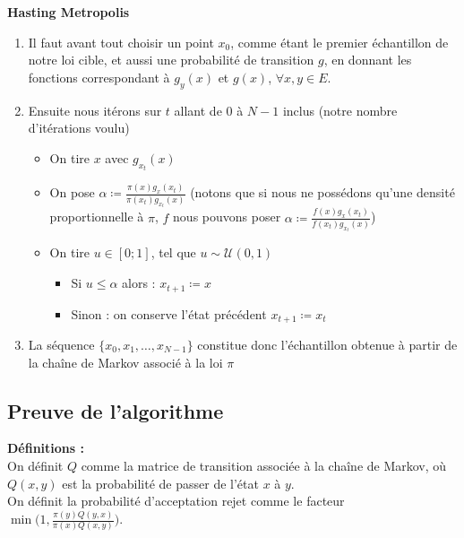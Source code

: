\documentclass{article}
\begin{document}
{\bf Hasting Metropolis} \begin{enumerate}
    \item Il faut avant tout choisir un point $x_0$, comme étant le premier échantillon de notre loi cible, et aussi une probabilité de transition $g$, en donnant les fonctions correspondant à $g_y(x)$ et $g(x)$, $\forall x,y \in E$.
    \item Ensuite nous itérons sur $t$ allant de 0 à $N-1$ inclus (notre nombre d'itérations voulu)
    \begin{itemize}
        \item On tire $x$ avec $g_{x_t}(x)$  
        \item On pose $\alpha \coloneqq \frac{ \pi(x) g_x(x_t)}{\pi(x_t) g_{x_t}(x)}$ (notons que si nous ne possédons qu'une densité proportionnelle à $\pi$, $f$ nous pouvons poser $\alpha \coloneqq \frac{ f(x) g_x(x_t)}{f(x_t) g_{x_t}(x)}$)  
        \item On tire $u \in [0;1]$, tel que $u  \sim \mathcal{U}(0,1)$ 
        \begin{itemize}
            \item Si $u \leqslant \alpha$ alors : $x_{t+1} \coloneqq x$  
            \item Sinon : on conserve l'état précédent $x_{t+1} \coloneqq x_t$  
        \end{itemize}
    \end{itemize}
    \item La séquence $\{x_0,x_1, \ldots ,x_{N-1}\}$ constitue donc l'échantillon obtenue à partir de la chaîne de Markov associé à la loi $\pi$
\end{enumerate}

\subsection{Preuve de l'algorithme}


\textbf{Définitions :} \\ 
On définit $Q$ comme la matrice de transition associée à la chaîne de Markov, où $Q(x, y)$ est la probabilité de passer de l'état $x$ à $y$.\\
On définit la probabilité d'acceptation rejet comme le facteur $\min\big(1, \frac{\pi(y) Q(y, x)}{\pi(x) Q(x, y)} \big)$.
\end{document}

